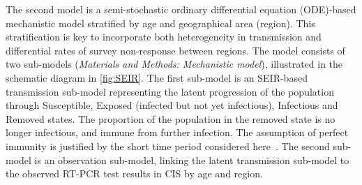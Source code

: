 \documentclass[9pt,twocolumn,twoside]{pnas-new}
\begin{document}
The second model is a semi-stochastic ordinary differential equation (ODE)-based mechanistic model stratified by age and geographical area (region). %
This stratification is key to incorporate both heterogeneity in transmission and differential rates of survey non-response between regions.
The model consists of two sub-models (\textit{Materials and Methods: Mechanistic model}), illustrated in the schematic diagram in \cref{fig:SEIR}.
The first sub-model is an SEIR-based transmission sub-model 
representing the latent progression of the population through Susceptible, Exposed (infected but not yet infectious), Infectious and Removed states. 
The proportion of the population in the removed state is no longer infectious, and immune from further infection.
The assumption of perfect immunity is justified by the short time period considered here~\citep{weiRisk,murchuReinfectionRisk}.
The second sub-model is an observation sub-model, linking the latent transmission sub-model to the observed RT-PCR test results in CIS by age and region.
\end{document}

